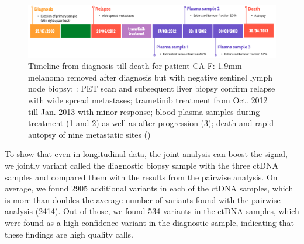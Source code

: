 \begin{figure}[!ht]
\centering
\includegraphics[width=.99\linewidth]{Figures/CA-F_timeline.png}
\caption[Timeline from diagnosis till death for patient CA-F]{Timeline from diagnosis till death for patient CA-F: 1.9mm melanoma removed after diagnosis \dateenglish{} but with negative sentinel lymph node biopsy; \dateenglish{}: PET scan and subsequent liver biopsy confirm relapse with wide spread metastases; trametinib treatment from Oct. 2012 till Jan. 2013 with minor response; blood plasma samples during treatment (1 and 2) as well as after progression (3); death and rapid autopsy of nine metastatic sites (\dateenglish{})}\label{fig:CA-Ftimeline}
\end{figure}


To show that even in longitudinal data, the joint analysis can boost the signal, we jointly variant called the diagnostic biopsy sample with the three ctDNA samples and compared them with the results from the pairwise analysis. On average, we found 2905 additional variants in each of the ctDNA samples, which is more than doubles the average number of variants found with the pairwise analysis (2414). Out of those, we found 534 variants in the ctDNA samples, which were found as a high confidence variant in the diagnostic sample, indicating that these findings are high quality calls. 

